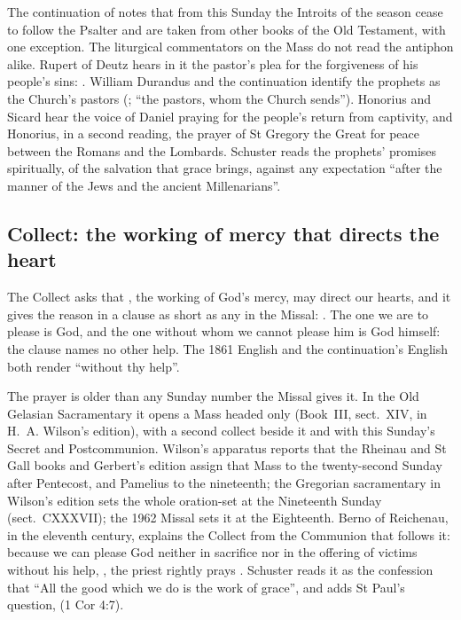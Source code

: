 The continuation of  notes that from this Sunday the
Introits of the season cease to follow the Psalter and are taken from other
books of the Old Testament, with one exception. The liturgical commentators on
the Mass do not read the antiphon alike. Rupert of Deutz hears
in it the pastor's plea for the forgiveness of his people's sins: . William Durandus and the continuation
identify the prophets as the Church's pastors (; ``the pastors, whom the Church sends''). Honorius and Sicard hear
the voice of Daniel praying for the people's return from captivity, and
Honorius, in a second reading, the prayer of St Gregory the Great for peace
between the Romans and the Lombards. Schuster reads the prophets' promises
spiritually, of the salvation that grace brings, against any expectation
``after the manner of the Jews and the ancient Millenarians''.

\subsection{Collect: the working of mercy that directs the heart}

The Collect asks that , the working of God's
mercy, may direct our hearts, and it gives the reason in a clause as short as
any in the Missal: . The one we
are to please is God, and the one without whom we cannot please him is God
himself: the clause names no other help. The 1861 English and the
continuation's English both render  ``without thy help''.

The prayer is older than any Sunday number the Missal gives it. In the Old
Gelasian Sacramentary it opens a Mass headed only 
(Book~III, sect.~XIV, in H.~A. Wilson's edition), with a second collect beside
it and with this Sunday's Secret and Postcommunion. Wilson's apparatus
reports that the Rheinau and St Gall books and Gerbert's edition assign that
Mass to the twenty-second Sunday after Pentecost, and Pamelius to the
nineteenth; the Gregorian sacramentary in Wilson's edition sets the whole
oration-set at the Nineteenth Sunday (sect.~CXXXVII); the 1962 Missal sets it
at the Eighteenth. Berno of Reichenau, in the eleventh
century, explains the Collect from the Communion that follows it: because we
can please God neither in sacrifice nor in the offering of victims without his
help, , the
priest rightly prays . Schuster reads it as the
confession that ``All the good which we do is the work of grace'', and adds
St Paul's question,  (1 Cor 4:7).

